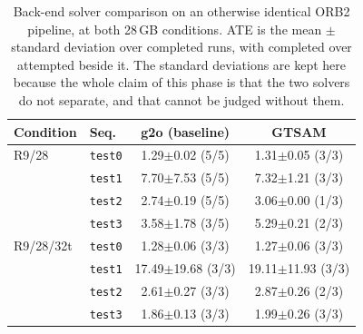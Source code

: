 \begin{table}[H]
\centering
\caption{Back-end solver comparison on an otherwise identical ORB2 pipeline, at both 28\,GB conditions. ATE is the mean $\pm$ standard deviation over completed runs, with completed over attempted beside it. The standard deviations are kept here because the whole claim of this phase is that the two solvers do not separate, and that cannot be judged without them.}
\label{tab:sw-be}
\small
\begin{tabular}{@{}llcc@{}}
\toprule
Condition & Seq. & g2o (baseline) & GTSAM \\
\midrule
R9/28 & \texttt{test0} & 1.29$\pm$0.02 (5/5) & 1.31$\pm$0.05 (3/3) \\
 & \texttt{test1} & 7.70$\pm$7.53 (5/5) & 7.32$\pm$1.21 (3/3) \\
 & \texttt{test2} & 2.74$\pm$0.19 (5/5) & 3.06$\pm$0.00 (1/3) \\
 & \texttt{test3} & 3.58$\pm$1.78 (3/5) & 5.29$\pm$0.21 (2/3) \\
\midrule
R9/28/32t & \texttt{test0} & 1.28$\pm$0.06 (3/3) & 1.27$\pm$0.06 (3/3) \\
 & \texttt{test1} & 17.49$\pm$19.68 (3/3) & 19.11$\pm$11.93 (3/3) \\
 & \texttt{test2} & 2.61$\pm$0.27 (3/3) & 2.87$\pm$0.26 (2/3) \\
 & \texttt{test3} & 1.86$\pm$0.13 (3/3) & 1.99$\pm$0.26 (3/3) \\
\bottomrule
\end{tabular}
\end{table}
